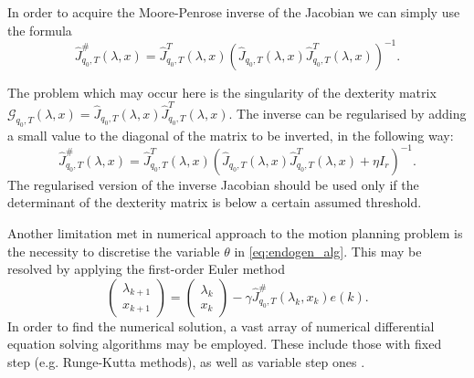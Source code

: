 In order to acquire the Moore-Penrose inverse of the Jacobian we can simply use the formula
\begin{equation}
\hat J^\#_{q_0, T}(\lambda, x)=\hat J^T_{q_0, T}(\lambda, x)\left(\hat J_{q_0, T}(\lambda, x)\hat J^T_{q_0, T}(\lambda, x)\right)^{-1}.
\end{equation}

The problem which may occur here is the singularity of the dexterity matrix\\
$\mathcal{G}_{q_0,T}(\lambda,x)=\hat J_{q_0, T}(\lambda, x)\hat J^T_{q_0, T}(\lambda, x)$. The inverse can be regularised by adding a small value to the diagonal of the matrix to be inverted, in the following way:
\begin{equation}
\hat J^\#_{q_0, T}(\lambda, x)=\hat J^T_{q_0, T}(\lambda, x)\left(\hat J_{q_0, T}(\lambda, x)\hat J^T_{q_0, T}(\lambda, x)+\eta I_r\right)^{-1}.
\end{equation}
The regularised version of the inverse Jacobian should be used only if the determinant of the dexterity matrix is below a certain assumed threshold.

Another limitation met in numerical approach to the motion planning problem is the necessity to discretise the variable $\theta$ in \eqref{eq:endogen_alg}.
This may be resolved by applying the first-order Euler method
\begin{equation}
\label{eq:endogen_num}
\begin{pmatrix}
\lambda_{k+1}\\
x_{k+1}
\end{pmatrix}  =\begin{pmatrix}\lambda_{k}\\
x_{k}
\end{pmatrix} - \gamma \hat J^\#_{q_0, T}(\lambda_k, x_k)e(k).
\end{equation}
In order to find the numerical solution, a vast array of numerical differential
equation solving algorithms may be employed. These include those with fixed step
(e.g. Runge-Kutta methods), as well as variable step ones \cite{solvers}.